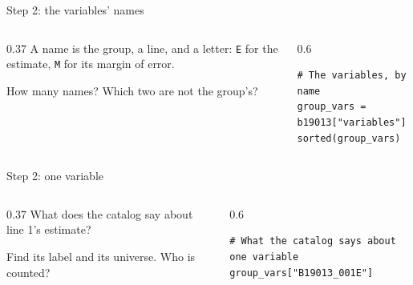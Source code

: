\documentclass[9pt,aspectratio=169]{beamer}
\begin{document}
\begin{frame}[fragile]{Step 2: the variables' names}
    \begin{columns}[T]
        \begin{column}{0.37\textwidth}
            A name is the group, a line, and a letter: \texttt{E} for the estimate, \texttt{M} for its margin of error.

            \medskip
            How many names? Which two are not the group's?
        \end{column}
        \begin{column}{0.6\textwidth}
\begin{lstlisting}
# The variables, by name
group_vars = b19013["variables"]
sorted(group_vars)
\end{lstlisting}
        \end{column}
    \end{columns}
\end{frame}

\begin{frame}[fragile]{Step 2: one variable}
    \begin{columns}[T]
        \begin{column}{0.37\textwidth}
            What does the catalog say about line 1's estimate?

            \medskip
            Find its label and its universe. Who is counted?
        \end{column}
        \begin{column}{0.6\textwidth}
\begin{lstlisting}
# What the catalog says about one variable
group_vars["B19013_001E"]
\end{lstlisting}
        \end{column}
    \end{columns}
\end{frame}
\end{document}
